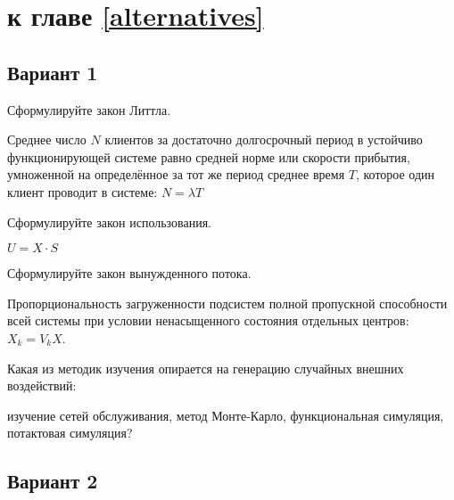 
\section{\Questions к главе \ref{alternatives}} %

\subsection*{Вариант 1}

\begin{questions}

\question[3] Сформулируйте закон Литтла.
\begin{solution}[2cm]
Среднее число $N$ клиентов за достаточно долгосрочный период в устойчиво функционирующей системе  равно средней норме или скорости прибытия, умноженной на определённое за тот же период среднее время $T$, которое один клиент проводит в системе: $N = \lambda T$
\end{solution}

\question[3] Сформулируйте закон использования.
\begin{solution}[2cm]
$U = X \cdot S $
\end{solution}

\question[3] Сформулируйте закон вынужденного потока.
\begin{solution}[2cm]
Пропорциональность загруженности подсистем полной пропускной способности всей системы при условии ненасыщенного состояния отдельных центров: $X_k = V_k X$.
\end{solution}

\question[3] Какая из методик изучения опирается на генерацию случайных внешних воздействий:
\begin{choices}
\choice изучение сетей обслуживания,
\correctchoice метод Монте-Карло,
\choice функциональная симуляция,
\choice потактовая симуляция?
\end{choices}


\end{questions}

\subsection*{Вариант 2}

